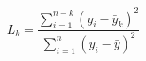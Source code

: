 \documentclass[12pt]{article}
\begin{document}
\pagestyle{empty}
\large
{}
\pagecolor{ehandbook}

\[
L_{k} = \frac{\sum_{i=1}^{n-k}{(y_{i} - \bar{y}_{k})^{2}}}
  {\sum_{i=1}^{n}{(y_{i} - \bar{y})^{2}}}
\]
\end{document}
